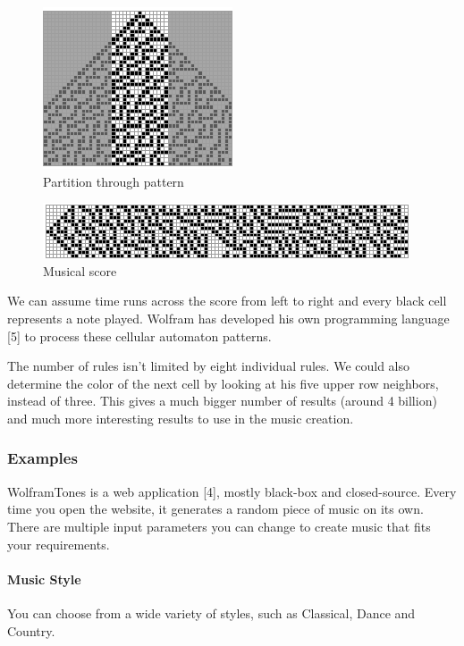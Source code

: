 \documentclass[12pt]{article}
\begin{document}
 \begin{figure}[h]
\centering
\includegraphics[]{img/wolframMusic1}
\caption{Partition through pattern}
\label{partition}
\end{figure}

\begin{figure}[h]
\centering
\includegraphics[]{img/wolframMusic2}
\caption{Musical score}
\label{score}
\end{figure}

We can assume time runs across the score from left to right and every black cell represents a note played. Wolfram has developed his own programming language [5] to process these cellular automaton patterns.
\newline

The number of rules isn't limited by eight individual rules. We could also determine the color of the next cell by looking at his five upper row neighbors, instead of three. This gives a much bigger number of results (around 4 billion) and much more interesting results to use in the music creation. 

\subsubsection{Examples}

WolframTones is a web application [4], mostly black-box and closed-source. Every time you open the website, it generates a random piece of music on its own. There are multiple input parameters you can change to create music that fits your requirements. 

\paragraph{Music Style} You can choose from a wide variety of styles, such as Classical, Dance and Country.
\end{document}
